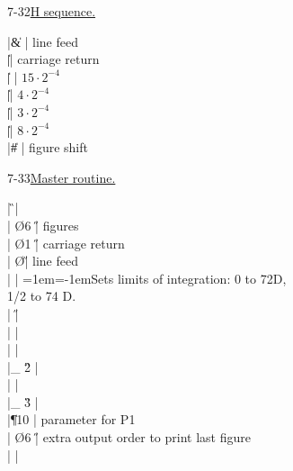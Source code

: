 \documentclass[letterpaper,11pt]{article}
\newcommand{\sect}[2]{\par\vspace{\baselineskip}#1\quad\uline{#2}}
\newcommand{\hang}{\leftskip=1em\parindent=-1em}
\begin{document}
\sect{7-32}{H sequence.}
\newcommand{\eindent}{\rlap{H}{\phantom{$\mbox{Start}\to{}$}}}
\begin{edsac}{0}
    |\| \&      \F | line feed          \\
    |\| \@      \F | carriage return    \\
    |\|  \F | $15\cdot2^{-4}$    \\
    |\| \R      \F | $4\cdot2^{-4}$     \\
    |\| \E      \F | $3\cdot2^{-4}$     \\
    |\| \I      \F | $8\cdot2^{-4}$     \\
    |\| \#      \F | figure shift
\end{edsac}

\sect{7-33}{Master routine.}
\begin{edsac}{0}
\nonum  |   \G     \K |                                     \\
        |   \O   6 \H | figures                             \\
        |   \O   1 \H | carriage return                     \\
        |   \O     \H | line feed                           \\
        |    \D | %
                        {\hang Sets limits of integration: 0 to
                         72D,\\1/2 to 74 D.\hspace{-15em}}  \\
        |    \H |                                     \\
        |    \D |                                     \\
        |    \@ |       \\
        |\_ \G   2 \! |                                     \\
        |    \@ |       \\
        |\_ \G   3 \! |                                     \\
        |\| \P  10 \F | parameter for P1                    \\
        |   \O   6 \H | extra output order to print last figure \\
        |   \Z     \F |
\end{edsac}
\end{document}
